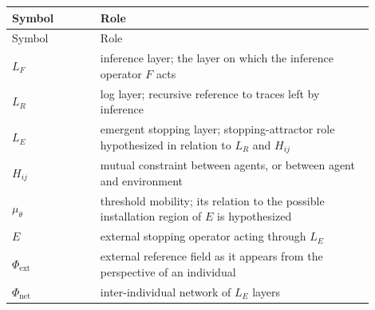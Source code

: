 \begin{longtable}{@{}p{0.22\linewidth}p{0.68\linewidth}@{}}
\toprule
Symbol & Role \\
\midrule
\endfirsthead
\toprule
Symbol & Role \\
\midrule
\endhead
$L_F$ & inference layer; the layer on which the inference operator $F$ acts \\
$L_R$ & log layer; recursive reference to traces left by inference \\
$L_E$ & emergent stopping layer; stopping-attractor role hypothesized in relation to $L_R$ and $H_{ij}$ \\
$H_{ij}$ & mutual constraint between agents, or between agent and environment \\
$\mu_\theta$ & threshold mobility; its relation to the possible installation region of $E$ is hypothesized \\
$E$ & external stopping operator acting through $L_E$ \\
$\Phi_{\text{ext}}$ & external reference field as it appears from the perspective of an individual \\
$\Phi_{\text{net}}$ & inter-individual network of $L_E$ layers \\
\bottomrule
\end{longtable}

\bigskip

